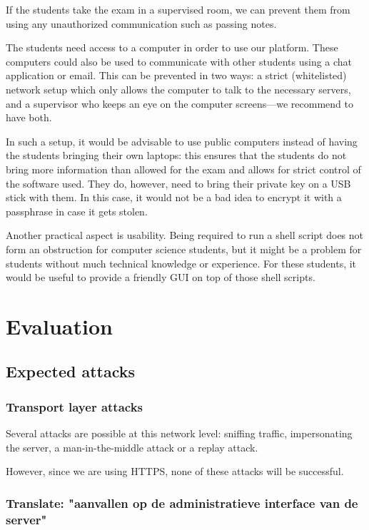 \documentclass[12pt]{article}
\begin{document}
If the students take the exam in a supervised room, we can prevent them from
using any unauthorized communication such as passing notes.

The students need access to a computer in order to use our platform. These
computers could also be used to communicate with other students using a chat
application or email. This can be prevented in two ways: a strict (whitelisted)
network setup which only allows the computer to talk to the necessary servers,
and a supervisor who keeps an eye on the computer screens---we recommend to have
both.

In such a setup, it would be advisable to use public computers instead of having
the students bringing their own laptops: this ensures that the students do not
bring more information than allowed for the exam and allows for strict control
of the software used. They do, however, need to bring their private key on a USB
stick with them. In this case, it would not be a bad idea to encrypt it with a
passphrase in case it gets stolen.

Another practical aspect is usability. Being required to run a shell script does
not form an obstruction for computer science students, but it might be a problem
for students without much technical knowledge or experience. For these students,
it would be useful to provide a friendly GUI on top of those shell scripts.

\section{Evaluation}
\subsection{Expected attacks}
\label{subsec:req-attacks}

\subsubsection{Transport layer attacks}

Several attacks are possible at this network level: sniffing traffic,
impersonating the server, a man-in-the-middle attack or a replay attack.

However, since we are using HTTPS, none of these attacks will be successful.

\subsubsection{Translate: "aanvallen op de administratieve interface van de
server"}
\end{document}

